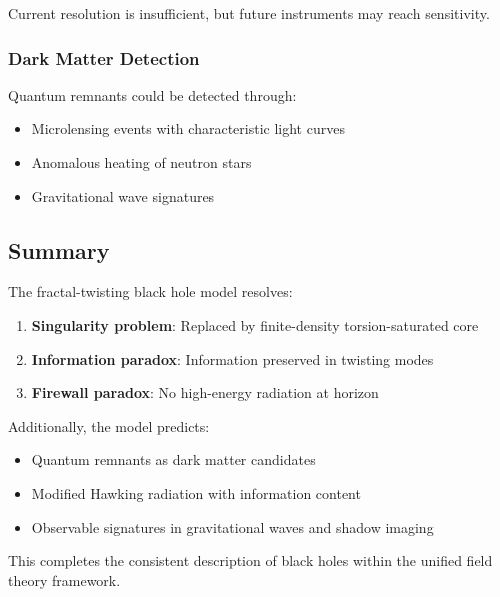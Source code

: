 Current resolution is insufficient, but future instruments may reach sensitivity.

\subsubsection{Dark Matter Detection}

Quantum remnants could be detected through:
\begin{itemize}
    \item Microlensing events with characteristic light curves
    \item Anomalous heating of neutron stars
    \item Gravitational wave signatures
\end{itemize}

\subsection{Summary}

The fractal-twisting black hole model resolves:
\begin{enumerate}
    \item \textbf{Singularity problem}: Replaced by finite-density torsion-saturated core
    \item \textbf{Information paradox}: Information preserved in twisting modes
    \item \textbf{Firewall paradox}: No high-energy radiation at horizon
\end{enumerate}

Additionally, the model predicts:
\begin{itemize}
    \item Quantum remnants as dark matter candidates
    \item Modified Hawking radiation with information content
    \item Observable signatures in gravitational waves and shadow imaging
\end{itemize}

This completes the consistent description of black holes within the unified field theory framework.
